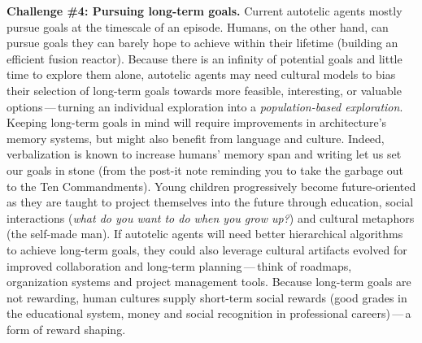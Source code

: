 \textbf{Challenge \#4: Pursuing long-term goals.} Current autotelic agents mostly pursue goals at the timescale of an episode. Humans, on the other hand, can pursue goals they can barely hope to achieve within their lifetime (\eg building an efficient fusion reactor). Because there is an infinity of potential goals and little time to explore them alone, autotelic agents may need cultural models to bias their selection of long-term goals towards more feasible, interesting, or valuable options\,---\,turning an individual exploration into a \textit{population-based exploration}.  Keeping long-term goals in mind will require improvements in architecture's memory systems, but might also benefit from language and culture. Indeed, verbalization is known to increase humans' memory span \cite{elliott_multilab_2021} and writing let us set our goals in stone (from the post-it note reminding you to take the garbage out to the Ten Commandments). Young children progressively become future-oriented as they are taught to project themselves into the future through education, social interactions (\textit{what do you want to do when you grow up?}) and cultural metaphors (\eg the self-made man).\cite{atance2008future} If autotelic agents will need better hierarchical \rl algorithms to achieve long-term goals, they could also leverage cultural artifacts evolved for improved collaboration and long-term planning\,---\,think of roadmaps, organization systems and
project management tools.\cite{carruthers_magic_1998} Because long-term goals are not rewarding, human cultures supply short-term social rewards (good grades in the educational system, money and social recognition in professional careers)\,---\,a form of reward shaping. 



